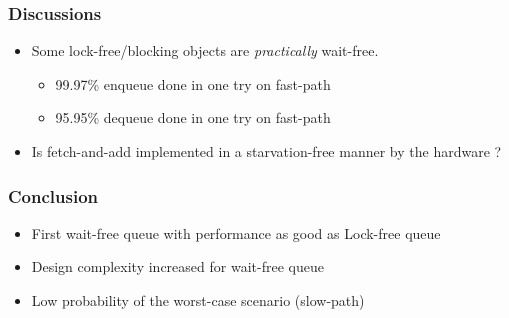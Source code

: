 \documentclass[10pt,a4paper]{beamer}
\begin{document}
\begin{frame}
  \frametitle{Discussions}
  \begin{itemize}
  \item[] Some lock-free/blocking objects are \textit{practically} wait-free.
    \medskip
  \begin{itemize}
  \item 99.97\% enqueue done in one try on fast-path \medskip
  \item 95.95\% dequeue done in one try on fast-path
  \end{itemize}
  \vfill
\item[] Is fetch-and-add implemented in a starvation-free manner by the hardware
  ?
  \end{itemize}
\end{frame}

\begin{frame}
  \frametitle{Conclusion}
  \begin{itemize}
  \item First wait-free queue with performance as good as Lock-free queue \vfill
  \item Design complexity increased for wait-free queue \vfill
  \item Low probability of the worst-case scenario (slow-path)
\end{itemize}
\end{frame}
\end{document}
